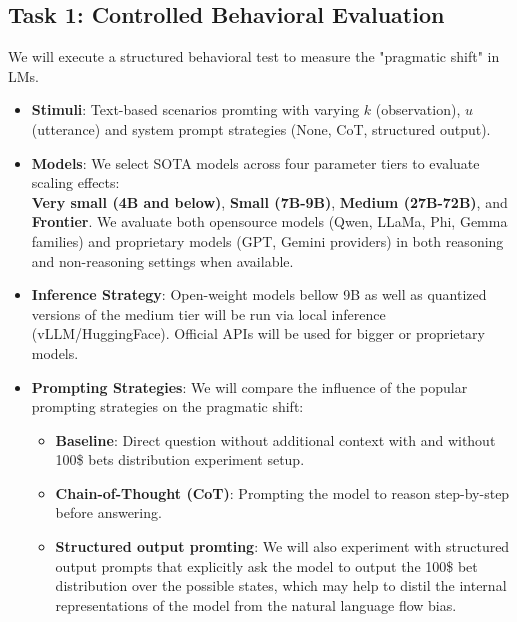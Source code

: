 \documentclass[11pt]{article}
\begin{document}
\subsection{Task 1: Controlled Behavioral Evaluation}
We will execute a structured behavioral test to measure the "pragmatic shift" in LMs.
\begin{itemize}
    \item \textbf{Stimuli}: Text-based scenarios promting with varying $k$ (observation), $u$ (utterance) and system prompt strategies (None, CoT, structured output). 
    \item \textbf{Models}: We select SOTA models across four parameter tiers to evaluate scaling effects:\\
    \textbf{Very small (4B and below)}, \textbf{Small (7B-9B)}, \textbf{Medium (27B-72B)}, and \textbf{Frontier}.
    We avaluate both opensource models (Qwen, LLaMa, Phi, Gemma families) and proprietary models (GPT, Gemini providers) in both reasoning and non-reasoning settings when available.
    \item \textbf{Inference Strategy}: Open-weight models bellow 9B as well as quantized versions of the medium tier will be run via local inference (vLLM/HuggingFace). Official APIs will be used for bigger or proprietary models.
    \item \textbf{Prompting Strategies}: We will compare the influence of the popular prompting strategies on the pragmatic shift:
    \begin{itemize}
        \item \textbf{Baseline}: Direct question without additional context with and without 100\$ bets distribution experiment setup.
        \item \textbf{Chain-of-Thought (CoT)}: Prompting the model to reason step-by-step before answering.
        \item \textbf{Structured output promting}: We will also experiment with structured output prompts that explicitly ask the model to output the 100\$ bet distribution over the possible states, which may help 
        to distil the internal representations of the model from the natural language flow bias.
    \end{itemize}
\end{itemize}
\end{document}
